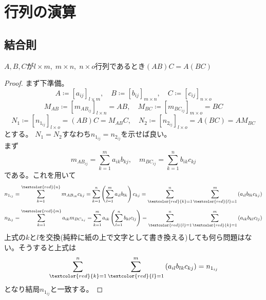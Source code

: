 \chapter{行列の演算}
    \section{結合則}
        \begin{shadebox}
            $A,B,C$が$l \times m,\; m \times n,\; n \times o$行列であるとき$(AB)C = A(BC)$
        \end{shadebox}
        \begin{proof}
            \quad\par
            まず下準備。
            \[A \coloneq \left[a_{ij}\right]_{l\times m},\quad B \coloneq \left[b_{ij}\right]_{m\times n},\quad C \coloneq \left[c_{ij}\right]_{n\times o}\]
            \[M_{AB} \coloneq \left[m_{{AB}_{ij}}\right]_{l\times n} = AB,\quad M_{BC} \coloneq [m_{{BC}_{ij}}]_{m\times o} = BC\]
            \[N_1 \coloneq \left[n_{1_{ij}}\right]_{l\times o} = (AB)C = M_{AB}C,\quad N_2 \coloneq \left[n_{2_{ij}}\right]_{l\times o} = A(BC) = AM_{BC}\]
            とする。
            $N_1 = N_2$すなわち$n_{1_{ij}} = n_{2_{ij}}$を示せば良い。\\
            まず
            \[m_{{AB}_{ij}} = \sum_{k=1}^{m}{a_{ik}b_{kj}},\quad m_{{BC}_{ij}} = \sum_{k=1}^{n}{b_{ik}c_{kj}}\]
            である。これを用いて
            \[n_{1_{ij}} = \sum_{k=1}^{\textcolor{red}{n}}{m_{{AB}_{ik}}c_{kj}} = \sum_{k=1}^{n}{\left(\sum_{l=1}^{m}{a_{il}b_{lk}}\right)c_{kj}} = \sum_{\textcolor{red}{k}=1}^{n}{\sum_{\textcolor{red}{l}=1}^{m}{\left(a_{il}b_{lk}c_{kj}\right)}}\]
            \[n_{2_{ij}} = \sum_{k=1}^{\textcolor{red}{m}}{a_{ik}m_{{BC}_{kj}}} = \sum_{k=1}^{m}{a_{ik}\left(\sum_{l=1}^{n}{b_{kl}c_{lj}}\right)} = \sum_{\textcolor{red}{l}=1}^{n}{\sum_{\textcolor{red}{k}=1}^{m}{\left(a_{ik}b_{kl}c_{lj}\right)}}\]
            上式の$k$と$l$を交換(純粋に紙の上で文字として書き換える)しても何ら問題はない。そうすると上式は
            \[\sum_{\textcolor{red}{k}=1}^{n}{\sum_{\textcolor{red}{l}=1}^{m}{\left(a_{il}b_{lk}c_{kj}\right)}} = n_{1_{ij}}\]
            となり結局$n_{1_{ij}}$と一致する。
        \end{proof}
